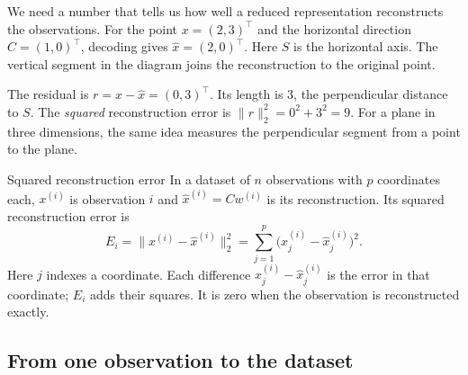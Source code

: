 We need a number that tells us how well a reduced representation
reconstructs the observations. For the point $x=(2,3)^\top$ and the
horizontal direction $C=(1,0)^\top$, decoding gives
$\hat{x}=(2,0)^\top$. Here $S$ is the horizontal axis. The vertical
segment in the diagram joins the reconstruction to the original point.

\begin{center}
\end{center}

The residual is $r=x-\hat{x}=(0,3)^\top$. Its length is $3$, the
perpendicular distance to $S$. The \emph{squared} reconstruction error
is $\lVert r\rVert_2^2=0^2+3^2=9$. For a plane in three dimensions,
the same idea measures the perpendicular segment from a point to the
plane.

\begin{frameddefn}{Squared reconstruction error}\label{def:reconstruction-error}
In a dataset of $n$ observations with $p$ coordinates each,
$x^{(i)}$ is observation $i$ and $\hat{x}^{(i)}=Cw^{(i)}$ is its
reconstruction. Its squared reconstruction error is
\[
  E_i=\lVert x^{(i)}-\hat{x}^{(i)}\rVert_2^2
     =\sum_{j=1}^{p}\bigl(x_j^{(i)}-\hat{x}_j^{(i)}\bigr)^2.
\]
Here $j$ indexes a coordinate. Each difference
$x_j^{(i)}-\hat{x}_j^{(i)}$ is the error in that coordinate; $E_i$
adds their squares. It is zero when the observation is reconstructed
exactly.
\end{frameddefn}

\subsection{From one observation to the dataset}

